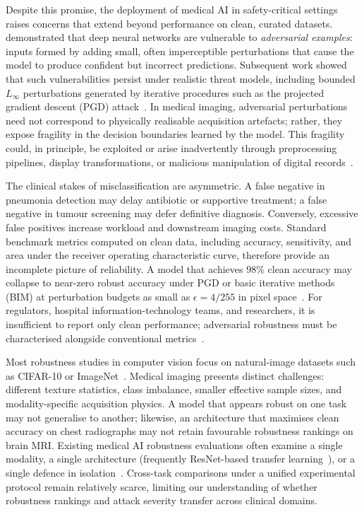 \documentclass[12pt,a4paper,oneside]{report}
\begin{document}
Despite this promise, the deployment of medical AI in safety-critical settings raises concerns that extend beyond performance on clean, curated datasets. \citet{szegedy2014intriguing} demonstrated that deep neural networks are vulnerable to \emph{adversarial examples}: inputs formed by adding small, often imperceptible perturbations that cause the model to produce confident but incorrect predictions. Subsequent work showed that such vulnerabilities persist under realistic threat models, including bounded $L_\infty$ perturbations generated by iterative procedures such as the projected gradient descent (PGD) attack~\cite{madry2018towards}. In medical imaging, adversarial perturbations need not correspond to physically realisable acquisition artefacts; rather, they expose fragility in the decision boundaries learned by the model. This fragility could, in principle, be exploited or arise inadvertently through preprocessing pipelines, display transformations, or malicious manipulation of digital records~\cite{finlayson2019adversarial,ma2021understanding}.

The clinical stakes of misclassification are asymmetric. A false negative in pneumonia detection may delay antibiotic or supportive treatment; a false negative in tumour screening may defer definitive diagnosis. Conversely, excessive false positives increase workload and downstream imaging costs. Standard benchmark metrics computed on clean data, including accuracy, sensitivity, and area under the receiver operating characteristic curve, therefore provide an incomplete picture of reliability. A model that achieves 98\% clean accuracy may collapse to near-zero robust accuracy under PGD or basic iterative methods (BIM) at perturbation budgets as small as $\epsilon = 4/255$ in pixel space~\cite{madry2018towards,kurakin2017adversarial}. For regulators, hospital information-technology teams, and researchers, it is insufficient to report only clean performance; adversarial robustness must be characterised alongside conventional metrics~\cite{finlayson2019adversarial}.

Most robustness studies in computer vision focus on natural-image datasets such as CIFAR-10 or ImageNet~\cite{madry2018towards,dong2018mim}. Medical imaging presents distinct challenges: different texture statistics, class imbalance, smaller effective sample sizes, and modality-specific acquisition physics. A model that appears robust on one task may not generalise to another; likewise, an architecture that maximises clean accuracy on chest radiographs may not retain favourable robustness rankings on brain MRI. Existing medical AI robustness evaluations often examine a single modality, a single architecture (frequently ResNet-based transfer learning~\cite{he2016deep}), or a single defence in isolation~\cite{ma2021understanding,finlayson2019adversarial}. Cross-task comparisons under a unified experimental protocol remain relatively scarce, limiting our understanding of whether robustness rankings and attack severity transfer across clinical domains.
\end{document}
